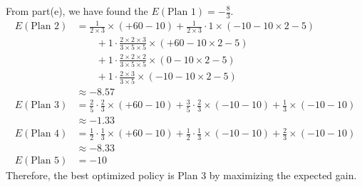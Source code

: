 \documentclass[preprint,12pt]{elsarticle}
\begin{document}
\begin{enumerate}[label=\alph*]
		From part(e), we have found the $E(\text{Plan 1}) = -\frac{8}{3}$.
		\begin{align*}
			E(\text{Plan 2}) &= \frac{1}{2\times 3}\times (+60-10) + \frac{1}{2\times 3}\cdot 1\times (-10-10\times 2 -5)\\
			&\qquad + 1\cdot \frac{2\times 2\times 3}{3\times 5\times 5}\times (+60-10\times 2 - 5)\\
			&\qquad + 1\cdot \frac{2\times 2\times 2}{3\times 5\times 5}\times (0-10\times 2 - 5)\\
			&\qquad + 1\cdot \frac{2\times 3}{3\times 5}\times (-10-10\times 2 - 5)\\
			&\approx -8.57\\
			E(\text{Plan 3}) &= \frac{2}{5}\cdot \frac{2}{3}\times (+60-10) + \frac{3}{5}\cdot \frac{2}{3}\times (-10-10) + \frac{1}{3}\times (-10-10)\\
			&\approx -1.33\\
			E(\text{Plan 4}) &= \frac{1}{2} \cdot \frac{1}{3}\times (+60-10) + \frac{1}{2} \cdot \frac{1}{3}\times (-10-10) + \frac{2}{3}\times (-10-10)\\
			&\approx -8.33\\
			E(\text{Plan 5}) &= -10
		\end{align*}
		Therefore, the best optimized policy is Plan 3 by maximizing the expected gain.

		
	\end{enumerate}
	
\end{document}
